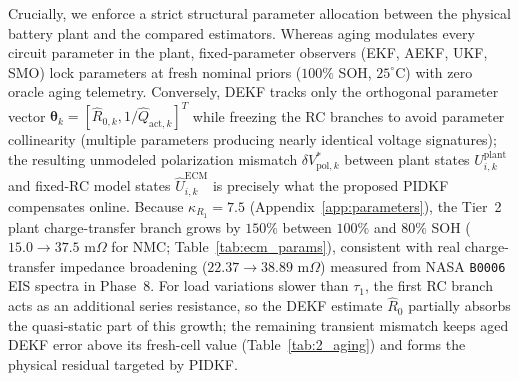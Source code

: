 \documentclass[11pt,a4paper]{article}
\begin{document}
Crucially, we enforce a strict structural parameter allocation between the physical battery plant and the compared estimators. Whereas aging modulates every circuit parameter in the plant, fixed-parameter observers (EKF, AEKF, UKF, SMO) lock parameters at fresh nominal priors ($100\%$ SOH, $25^\circ\text{C}$) with zero oracle aging telemetry. Conversely, DEKF tracks only the orthogonal parameter vector $\hat{\boldsymbol{\theta}}_k = [\hat{R}_{0,k}, 1/\hat{Q}_{\text{act},k}]^T$ while freezing the RC branches to avoid parameter collinearity (multiple parameters producing nearly identical voltage signatures); the resulting unmodeled polarization mismatch $\delta V_{\text{pol},k}^*$ between plant states $U_{i,k}^{\text{plant}}$ and fixed-RC model states $\hat{U}_{i,k}^{\text{ECM}}$ is precisely what the proposed PIDKF compensates online. Because $\kappa_{R_1} = 7.5$ (Appendix~\ref{app:parameters}), the Tier~2 plant charge-transfer branch grows by $150\%$ between $100\%$ and $80\%$ SOH ($15.0\rightarrow 37.5\text{ m}\Omega$ for NMC; Table~\ref{tab:ecm_params}), consistent with real charge-transfer impedance broadening ($22.37\rightarrow 38.89\text{ m}\Omega$) measured from NASA \texttt{B0006} EIS spectra in Phase~8. For load variations slower than $\tau_1$, the first RC branch acts as an additional series resistance, so the DEKF estimate $\hat{R}_0$ partially absorbs the quasi-static part of this growth; the remaining transient mismatch keeps aged DEKF error above its fresh-cell value (Table~\ref{tab:2_aging}) and forms the physical residual targeted by PIDKF.
\end{document}
